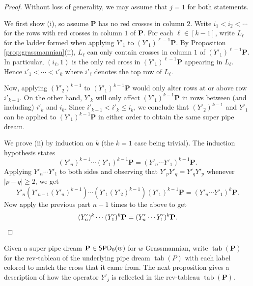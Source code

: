 \documentclass[11pt,reqno]{amsart} %
\newcommand{\bfP}{\mathbf{P}}
\DeclareMathOperator{\SPD}{\sf{SPD}}
\DeclareMathOperator{\tab}{tab}
\theoremstyle{definition}
\begin{document}
\begin{proof}
Without loss of generality, we may assume that $j = 1$ for both statements.

We first show (i), so assume $\bfP$ has no red crosses in column $2$.
Write $i_1< i_2< \cdots$ for the rows with red crosses in column $1$ of $\bfP$.
For each $\ell\in [k-1]$, write $L_\ell$ for the ladder formed when applying $Y'_1$ to $(Y'_1)^{\ell-1}\bfP$.
By Proposition \ref{prop:grassmannian}(ii), $L_\ell$ can only contain crosses in column $1$ of $(Y'_1)^{\ell-1}\bfP$.
In particular, $(i_\ell,1)$ is the only red cross in $(Y'_1)^{\ell-1}\bfP$ appearing in $L_\ell$.
Hence $i'_1< \cdots < i'_k$ where $i'_\ell$ denotes the top row of $L_\ell$.

Now, applying $(Y'_2)^{k-1}$ to $(Y'_1)^{k-1}\bfP$ would only alter rows at or above row $i'_{k-1}$.
On the other hand, $Y'_k$ will only affect $(Y'_1)^{k-1}\bfP$ in rows between (and including) $i'_k$ and $i_k$.
Since $i'_{k-1} < i'_k\leq i_k$, we conclude that $(Y'_2)^{k-1}$ and $Y'_1$ can be applied to $(Y'_1)^{k-1}\bfP$ in either order to obtain the same super pipe dream.

We prove (ii) by induction on $k$ (the $k=1$ case being trivial).
The induction hypothesis states \[
    (Y'_n)^{k-1}\cdots (Y'_1)^{k-1}\bfP
    = (Y'_n\cdots Y'_1)^{k-1}\bfP.
\]
Applying $Y'_n\cdots Y'_1$ to both sides and observing that $Y'_pY'_q = Y'_qY'_p$ whenever $|p-q|\geq 2$, we get \[
    Y'_n
    \left(Y'_{n-1}(Y'_n)^{k-1}\right)\cdots
    \left(Y'_1(Y'_2)^{k-1}\right)
    (Y'_1)^{k-1}\bfP
    = (Y'_n\cdots Y'_1)^k\bfP.
\]
Now apply the previous part $n-1$ times to the above to get \[
    (Y'_n)^k\cdots (Y'_1)^k\bfP
    = (Y'_n\cdots Y'_1)^k\bfP.
    \qedhere
\]
\end{proof}

Given a super pipe dream $\bfP\in \SPD_0(w)$ for $w$ Grassmannian, write $\tab(\bfP)$ for the rev-tableau of the underlying pipe dream $\tab(P)$ with each label colored to match the cross that it came from.
The next proposition gives a description of how the operator $Y'_j$ is reflected in the rev-tableau $\tab(\bfP)$. 
\end{document}
